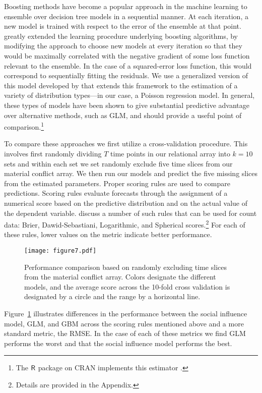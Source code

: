 Boosting methods have become a popular approach in the machine learning to ensemble over decision tree models in a sequential manner. At each iteration, a new model is trained with respect to the error of the ensemble at that point. \citet{friedman:2001} greatly extended the learning procedure underlying boosting algorithms, by modifying the approach to choose new models at every iteration so that they would be maximally correlated with the negative gradient of some loss function relevant to the ensemble. In the case of a squared-error loss function, this would correspond to sequentially fitting the residuals. We use a generalized version of this model developed by \citet{ridgeway:2012} that extends this framework to the estimation of a variety of distribution types---in our case, a Poisson regression model. In general, these types of models have been shown to give substantial predictive advantage over alternative methods, such as GLM, and should provide a useful point of comparison.\footnote{The $\sf{R}$  package on CRAN implements this estimator \citep{ridgeway:2012}.}

To compare these approaches we first utilize a cross-validation procedure. This involves first randomly dividing $T$ time points in our relational array into $k=10$ sets and within each set we set randomly exclude five time slices from our material conflict array. We then run our models and predict the five missing slices from the estimated parameters. Proper scoring rules are used to compare predictions. Scoring rules evaluate forecasts through the assignment of a numerical score based on the predictive distribution and on the actual value of the dependent variable. \citet{czado:etal:2009} discuss a number of such rules that can be used for count data: Brier, Dawid-Sebastiani, Logarithmic, and Spherical scores.\footnote{Details are provided in the Appendix.} For each of these rules, lower values on the metric indicate better performance.

\begin{figure}[ht]
	\centering
	\texttt{[image: figure7.pdf]}
	\caption{Performance comparison based on randomly excluding time slices from the material conflict array. Colors designate the different models, and the average score across the 10-fold cross validation is designated by a circle and the range by a horizontal line.}
	\label{fig:predCompareRandom}
	\end{figure}
\FloatBarrier

Figure~\ref{fig:predCompareRandom} illustrates differences in the performance between the social influence model, GLM, and GBM across the scoring rules mentioned above and a more standard metric, the RMSE. In the case of each of these metrics we find GLM performs the worst and that the social influence model performs the best.

